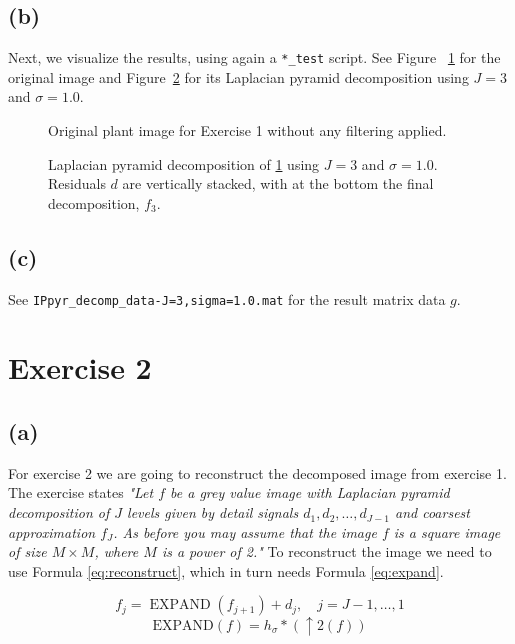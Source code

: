 \documentclass{article}
\begin{document}
\subsection*{(b)} Next, we visualize the results, using again a \texttt{*\_test} script. See Figure ~\ref{fig:plant_original} for the original image and Figure~\ref{fig:plant_all_pyr-decomp} for its Laplacian pyramid decomposition using $J=3$ and $\sigma=1.0$.

\begin{figure}[h]
    \centering
    
    \caption{Original plant image for Exercise 1 without any filtering applied.}
    \label{fig:plant_original}
\end{figure}

\begin{figure}[H]
    \centering
    
    \caption{Laplacian pyramid decomposition of \ref{fig:plant_original} using $J=3$ and $\sigma=1.0$. Residuals $d$ are vertically stacked, with at the bottom the final decomposition, $f_{3}$.}
    \label{fig:plant_all_pyr-decomp}
\end{figure}

\subsection*{(c)} See \texttt{IPpyr\_decomp\_data-J=3,sigma=1.0.mat} for the result matrix data $g$.

\newpage
\section*{Exercise 2}
\subsection*{(a)}
For exercise 2 we are going to reconstruct the decomposed image from exercise 1. The exercise states \textit{"Let $f$ be a grey value image with Laplacian pyramid decomposition of $J$ levels given by detail signals $d_1, d_2, \ldots , d_{J−1}$ and coarsest approximation $f_J$. As before you may assume that the image $f$ is a square image of size $M \times M$, where $M$ is a power of 2."} To reconstruct the image we need to use Formula \ref{eq:reconstruct}, which in turn needs Formula \ref{eq:expand}.

\begin{equation}\label{eq:reconstruct}
    f_{j}=\operatorname{EXPAND}\left(f_{j+1}\right)+d_j, \quad j=J-1, \ldots, 1
\end{equation}
\begin{equation}\label{eq:expand}
    \mathrm{EXPAND}(f)=h_{\sigma} *(\uparrow 2(f))
\end{equation}
\end{document}
